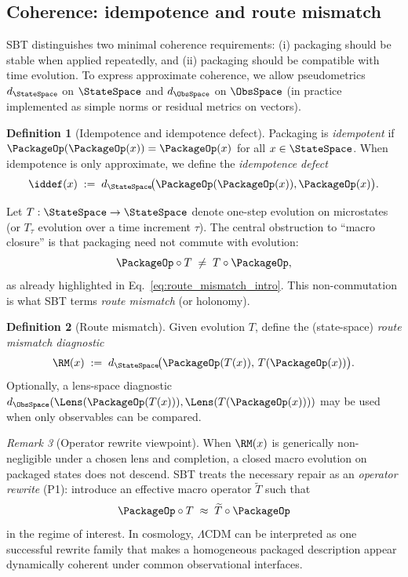 \documentclass[11pt]{article}
\theoremstyle{definition}
\newtheorem{definition}{Definition}[section]
\theoremstyle{plain}
\theoremstyle{remark}
\newtheorem{remark}[definition]{Remark}
\begin{document}
\subsection{Coherence: idempotence and route mismatch}\label{sec:framework:mismatch}
SBT distinguishes two minimal coherence requirements: (i) packaging should be stable when applied repeatedly, and (ii) packaging should be compatible with time evolution.
To express approximate coherence, we allow pseudometrics $d_{\StateSpace}$ on $\StateSpace$ and $d_{\ObsSpace}$ on $\ObsSpace$ (in practice implemented as simple norms or residual metrics on vectors).

\begin{definition}[Idempotence and idempotence defect]
Packaging is \emph{idempotent} if $\PackageOp(\PackageOp(x))=\PackageOp(x)$ for all $x\in\StateSpace$.
When idempotence is only approximate, we define the \emph{idempotence defect}
\begin{equation}
\iddef(x) \;:=\; d_{\StateSpace}\!\big(\PackageOp(\PackageOp(x)),\PackageOp(x)\big).
\label{eq:idempotence_defect}
\end{equation}
\end{definition}

Let $T:\StateSpace\to\StateSpace$ denote one-step evolution on microstates (or $T_\tau$ evolution over a time increment $\tau$).
The central obstruction to ``macro closure'' is that packaging need not commute with evolution:
\begin{equation}
\PackageOp\circ T \;\neq\; T\circ \PackageOp,
\end{equation}
as already highlighted in Eq.~\eqref{eq:route_mismatch_intro}.
This non-commutation is what SBT terms \emph{route mismatch} (or holonomy).

\begin{definition}[Route mismatch]
Given evolution $T$, define the (state-space) \emph{route mismatch diagnostic}
\begin{equation}
\RM(x) \;:=\; d_{\StateSpace}\!\big(\PackageOp(T(x)),\,T(\PackageOp(x))\big).
\label{eq:route_mismatch_def}
\end{equation}
Optionally, a lens-space diagnostic $d_{\ObsSpace}(\Lens(\PackageOp(T(x))),\Lens(T(\PackageOp(x))))$ may be used when only observables can be compared.
\end{definition}

\begin{remark}[Operator rewrite viewpoint]
When $\RM(x)$ is generically non-negligible under a chosen lens and completion, a closed macro evolution on packaged states does not descend.
SBT treats the necessary repair as an \emph{operator rewrite} (P1): introduce an effective macro operator $\widetilde{T}$ such that
\begin{equation}
\PackageOp\circ T \;\approx\; \widetilde{T}\circ \PackageOp
\label{eq:rewrite_condition}
\end{equation}
in the regime of interest.
In cosmology, $\Lambda$CDM can be interpreted as one successful rewrite family that makes a homogeneous packaged description appear dynamically coherent under common observational interfaces.
\end{remark}
\end{document}
